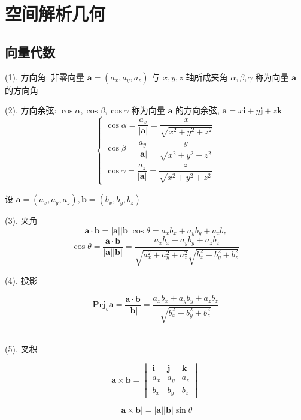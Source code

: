 \chapter{空间解析几何}
\section{向量代数}
\begin{definition}[向量代数]
	(1). 方向角: 非零向量 $\boldsymbol{a} = (a_{x},a_{y},a_{z})$ 与 $x,y,z$ 轴所成夹角 $\alpha,\beta,\gamma$ 称为向量 $\boldsymbol{a}$ 的方向角 
	
	(2). 方向余弦: $\cos \alpha,\cos \beta,\cos\gamma$ 称为向量 $\boldsymbol{a}$ 的方向余弦, $\boldsymbol{a} = x\boldsymbol{i} + y\boldsymbol{j} + z\boldsymbol{k}$
	$$\begin{cases}
		\cos \alpha=\dfrac{a_{x}}{|\boldsymbol{a}|} = \dfrac{x}{\sqrt{x^{2}+y^{2}+z^{2}}}\\
		\cos \beta=\dfrac{a_{y}}{|\boldsymbol{a}|} = \dfrac{y}{\sqrt{x^{2}+y^{2}+z^{2}}}\\
		\cos \gamma=\dfrac{a_{z}}{|\boldsymbol{a}|} = \dfrac{z}{\sqrt{x^{2}+y^{2}+z^{2}}}
	\end{cases}$$

	设 $\boldsymbol{a} = (a_{x},a_{y},a_{z}), \boldsymbol{b} = (b_{x},b_{y},b_{z})$

	(3). 夹角
	$$\boldsymbol{a}\cdot \boldsymbol{b} = |\boldsymbol{a}||\boldsymbol{b}|\cos \theta = a_{x}b_{x}+a_{y}b_{y}+a_{z}b_{z}$$
	$$\cos \theta = \dfrac{\boldsymbol{a}\cdot \boldsymbol{b}}{|\boldsymbol{a}||\boldsymbol{b}|} = \dfrac{a_{x}b_{x}+a_{y}b_{y}+a_{z}b_{z}}{\sqrt{a_{x}^2+a_{y}^2+a_{z}^2}\sqrt{b_{x}^2+b_{y}^2+b_{z}^2}}$$
	
	(4). 投影

	$$\textbf{Prj}_{b}\boldsymbol{a}=\dfrac{\boldsymbol{a}\cdot \boldsymbol{b}}{|\boldsymbol{b}|}=\dfrac{a_{x}b_{x}+a_{y}b_{y}+a_{z}b_{z}}{\sqrt{b_{x}^2+b_{y}^2+b_{z}^2}}$$\

	(5). 叉积

	$$\boldsymbol{a}\times \boldsymbol{b} = \begin{vmatrix}
		\boldsymbol{i} & \boldsymbol{j} & \boldsymbol{k} \\
		a_{x} & a_{y} & a_{z} \\
		b_{x} & b_{y} & b_{z}
	\end{vmatrix}$$
	
	$$|\boldsymbol{a}\times \boldsymbol{b}| = |\boldsymbol{a}||\boldsymbol{b}|\sin\theta$$
\end{definition}

